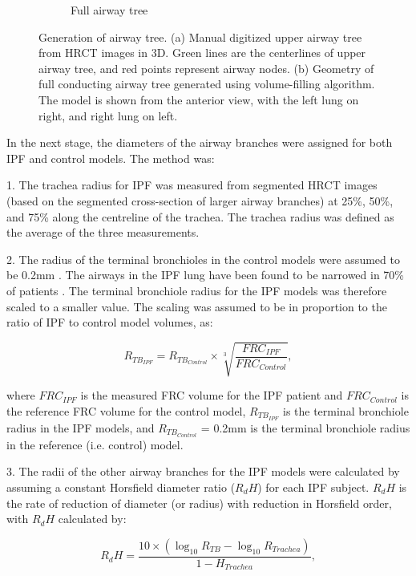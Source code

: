 \begin{figure}[htbp]
\begin{subfigure}{.425\linewidth}
  \caption{Full airway tree}
  \label{fig:AirwayGeneration-b} 
\end{subfigure}
\caption{Generation of airway tree. (a) Manual digitized upper airway tree from HRCT images in 3D. Green lines are the centerlines of upper airway tree, and red points represent airway nodes. (b) Geometry of full conducting airway tree generated using volume-filling algorithm. The
model is shown from the anterior view, with the left lung on right, and right lung on left.} 
\label{fig:AirwayGeneration}
\end{figure}

In the next stage, the diameters of the airway branches were assigned for both IPF and control models. The method was:

1. The trachea radius for IPF was measured from segmented HRCT images (based on the segmented cross-section of larger airway branches) at 25\%, 50\%, and 75\% along the centreline of the trachea. The trachea radius was defined as the average of the three measurements.

2. The radius of the terminal bronchioles in the control models were assumed to be 0.2mm \citep{horsfield1976diameter}. The airways in the IPF lung have been found to be narrowed in 70\% of patients \citep{crystal1976idiopathic}. The terminal bronchiole radius for the IPF models was therefore scaled to a smaller value. The scaling was assumed to be in proportion to the ratio of IPF to control model volumes, as:

\begin{equation}
 \label{eq:NarrowedTerminalRadius}
 R_{{TB}_{IPF}} = R_{{TB}_{Control}} \times \sqrt[3]{\frac{FRC_{IPF}}{FRC_{Control}}},
\end{equation}

\noindent where $FRC_{IPF}$ is the measured FRC volume for the IPF patient and $FRC_{Control}$ is the reference FRC volume for the control model, $R_{{TB}_{IPF}}$ is the terminal bronchiole radius in the IPF models, and $R_{{TB}_{Control}}$ = 0.2mm is the terminal bronchiole radius in the reference (i.e. control) model.  

3. The radii of the other airway branches for the IPF models were calculated by assuming a constant Horsfield diameter ratio ($R_dH$) for each IPF subject. $R_dH$ is the rate of reduction of diameter (or radius) with reduction in Horsfield order, with $R_dH$ calculated by:

\begin{equation}
 \label{eq:HorsfieldRadiusRatio}
 R_dH = \frac{10 \times (\log_{10}R_{TB} - \log_{10}R_{Trachea})}{1-H_{Trachea}},
\end{equation}

